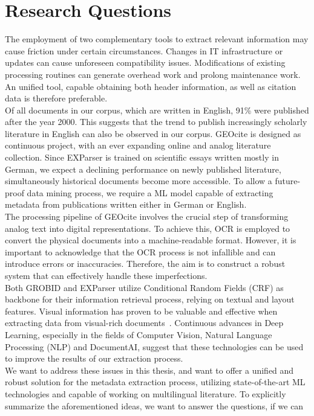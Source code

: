 \section{Research Questions}\label{sec:research_questions}
The employment of two complementary tools to extract relevant information may cause friction under certain circumstances. Changes in IT infrastructure or updates can cause unforeseen compatibility issues. Modifications of existing processing routines can generate overhead work and prolong maintenance work. An unified tool, capable obtaining both header information, as well as citation data is therefore preferable.\\
Of all documents in our corpus, which are written in English, 91\% were published after the year 2000. This suggests that the trend to publish increasingly scholarly literature in English \cite{di2017publish} can also be observed in our corpus. GEOcite is designed as continuous project, with an ever expanding online and analog literature collection. Since EXParser is trained on scientific essays written mostly in German, we expect a declining performance on newly published literature, simultaneously historical documents become more accessible. To allow a future-proof data mining process, we require a ML model capable of extracting metadata from publications written either in German or English.\\
The processing pipeline of GEOcite involves the crucial step of transforming analog text into digital representations. To achieve this, OCR is employed to convert the physical documents into a machine-readable format. However, it is important to acknowledge that the OCR process is not infallible and can introduce errors or inaccuracies. Therefore, the aim is to construct a robust system that can effectively handle these imperfections.\\
Both GROBID and EXParser utilize Conditional Random Fields (CRF) as backbone for their information retrieval process, relying on textual and layout features. Visual information has proven to be valuable and effective when extracting data from visual-rich documents~\cite{cui2021document}. Continuous advances in Deep Learning, especially in the fields of Computer Vision, Natural Language Processing (NLP) and DocumentAI, suggest that these technologies can be used to improve the results of our extraction process.\\
We want to address these issues in this thesis, and want to offer a unified and robust solution for the metadata extraction process, utilizing state-of-the-art ML technologies and capable of working on multilingual literature. To explicitly summarize the aforementioned ideas, we want to answer the questions, if we can
